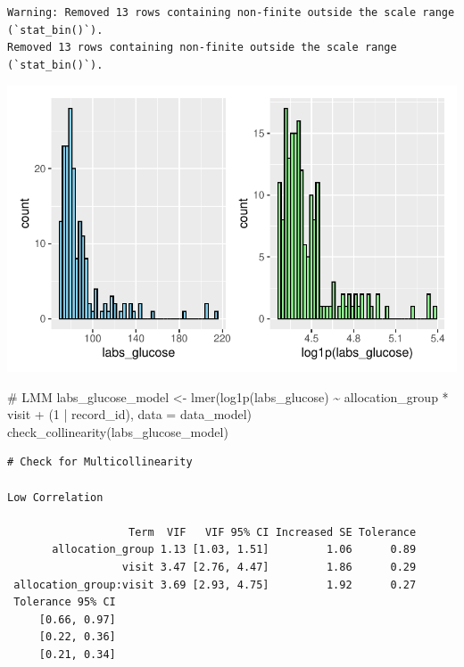 \documentclass[
  letterpaper,
  DIV=11,
  numbers=noendperiod]{scrartcl}
\newenvironment{Shaded}{\begin{snugshade}}{\end{snugshade}}
\newcommand{\AttributeTok}[1]{\textcolor[rgb]{0.40,0.45,0.13}{#1}}
\newcommand{\CommentTok}[1]{\textcolor[rgb]{0.37,0.37,0.37}{#1}}
\newcommand{\DecValTok}[1]{\textcolor[rgb]{0.68,0.00,0.00}{#1}}
\newcommand{\FunctionTok}[1]{\textcolor[rgb]{0.28,0.35,0.67}{#1}}
\newcommand{\NormalTok}[1]{\textcolor[rgb]{0.00,0.23,0.31}{#1}}
\newcommand{\OtherTok}[1]{\textcolor[rgb]{0.00,0.23,0.31}{#1}}
\newcommand{\SpecialCharTok}[1]{\textcolor[rgb]{0.37,0.37,0.37}{#1}}
\begin{document}
\begin{verbatim}
Warning: Removed 13 rows containing non-finite outside the scale range (`stat_bin()`).
Removed 13 rows containing non-finite outside the scale range (`stat_bin()`).
\end{verbatim}

\includegraphics{Outcomes_V1V2V3_files/figure-pdf/labs_glucose_1-1.pdf}

\begin{Shaded}
\begin{Highlighting}[]
\CommentTok{\# LMM}
\NormalTok{labs\_glucose\_model }\OtherTok{\textless{}{-}} \FunctionTok{lmer}\NormalTok{(}\FunctionTok{log1p}\NormalTok{(labs\_glucose) }\SpecialCharTok{\textasciitilde{}}\NormalTok{ allocation\_group }\SpecialCharTok{*}\NormalTok{ visit }\SpecialCharTok{+}\NormalTok{ (}\DecValTok{1} \SpecialCharTok{|}\NormalTok{ record\_id), }\AttributeTok{data =}\NormalTok{ data\_model)}
\FunctionTok{check\_collinearity}\NormalTok{(labs\_glucose\_model)}
\end{Highlighting}
\end{Shaded}

\begin{verbatim}
# Check for Multicollinearity

Low Correlation

                   Term  VIF   VIF 95% CI Increased SE Tolerance
       allocation_group 1.13 [1.03, 1.51]         1.06      0.89
                  visit 3.47 [2.76, 4.47]         1.86      0.29
 allocation_group:visit 3.69 [2.93, 4.75]         1.92      0.27
 Tolerance 95% CI
     [0.66, 0.97]
     [0.22, 0.36]
     [0.21, 0.34]
\end{verbatim}
\end{document}
